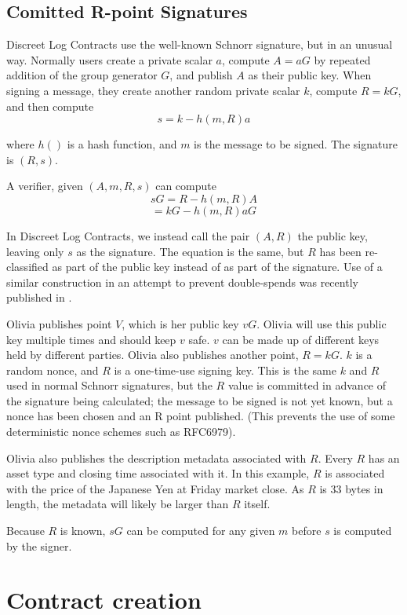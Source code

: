 \documentclass[11pt]{article}
\begin{document}
\subsection*{Comitted R-point Signatures}

Discreet Log Contracts use the well-known Schnorr signature\cite{schnorr1990efficient}, but in an unusual way.  Normally users create a private scalar \(a\), compute \(A = aG\) by repeated addition of the group generator \(G\), and publish \(A\) as their public key.  When signing a message, they create another random private scalar \(k\), compute \(R = kG\), and then compute  \[s = k - h(m, R)a\]

where \(h()\) is a hash function, and \(m\) is the message to be signed.  The signature is \((R, s)\).

A verifier, given \((A, m, R, s)\) can compute
\[sG = R - h(m, R)A\]
\[= kG - h(m, R)aG\]

In Discreet Log Contracts, we instead call the pair \((A, R)\) the public key, leaving only \(s\) as the signature.  The equation is the same, but \(R\) has been re-classified as part of the public key instead of as part of the signature.  Use of a similar construction in an attempt to prevent double-spends was recently published in \cite{cryptoeprint:2017:394}.

Olivia publishes point \(V\), which is her public key \(vG\).  Olivia will use this public key multiple times and should keep \(v\) safe.  \(v\) can be made up of different keys held by different parties.  Olivia also publishes another point, \(R = kG\).  \(k\) is a random nonce, and \(R\) is a one-time-use signing key.  This is the same \(k\) and \(R\)  used in normal Schnorr signatures, but the \(R\) value is committed in advance of the signature being calculated; the message to be signed is not yet known, but a nonce has been chosen and an R point published.  (This prevents the use of some deterministic nonce schemes such as RFC6979).

Olivia also publishes the description metadata associated with \(R\).  Every \(R\) has an asset type and closing time associated with it.  In this example, \(R\) is associated with the price of the Japanese Yen at Friday market close.  As \(R\) is 33 bytes in length, the metadata will likely be larger than \(R\) itself.

Because \(R\) is known, \(sG\) can be computed for any given \(m\) before \(s\) is computed by the signer.

\section*{Contract creation}
\end{document}
